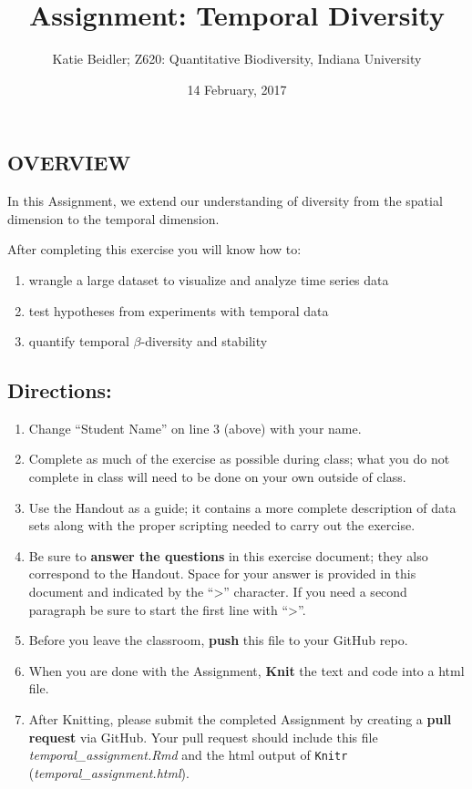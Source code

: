 \documentclass[]{article}
\title{Assignment: Temporal Diversity}
\author{Katie Beidler; Z620: Quantitative Biodiversity, Indiana University}
\date{14 February, 2017}
\providecommand{\tightlist}{%
  \setlength{\itemsep}{0pt}\setlength{\parskip}{0pt}}
\begin{document}
\maketitle

\subsection{OVERVIEW}\label{overview}

In this Assignment, we extend our understanding of diversity from the
spatial dimension to the temporal dimension.

After completing this exercise you will know how to:

\begin{enumerate}
\def\labelenumi{\arabic{enumi}.}
\tightlist
\item
  wrangle a large dataset to visualize and analyze time series data
\item
  test hypotheses from experiments with temporal data
\item
  quantify temporal \(\beta\)-diversity and stability
\end{enumerate}

\subsection{Directions:}\label{directions}

\begin{enumerate}
\def\labelenumi{\arabic{enumi}.}
\tightlist
\item
  Change ``Student Name'' on line 3 (above) with your name.
\item
  Complete as much of the exercise as possible during class; what you do
  not complete in class will need to be done on your own outside of
  class.
\item
  Use the Handout as a guide; it contains a more complete description of
  data sets along with the proper scripting needed to carry out the
  exercise.
\item
  Be sure to \textbf{answer the questions} in this exercise document;
  they also correspond to the Handout. Space for your answer is provided
  in this document and indicated by the ``\textgreater{}'' character. If
  you need a second paragraph be sure to start the first line with
  ``\textgreater{}''.
\item
  Before you leave the classroom, \textbf{push} this file to your GitHub
  repo.
\item
  When you are done with the Assignment, \textbf{Knit} the text and code
  into a html file.
\item
  After Knitting, please submit the completed Assignment by creating a
  \textbf{pull request} via GitHub. Your pull request should include
  this file \emph{temporal\_assignment.Rmd} and the html output of
  \texttt{Knitr} (\emph{temporal\_assignment.html}).
\end{enumerate}
\end{document}
